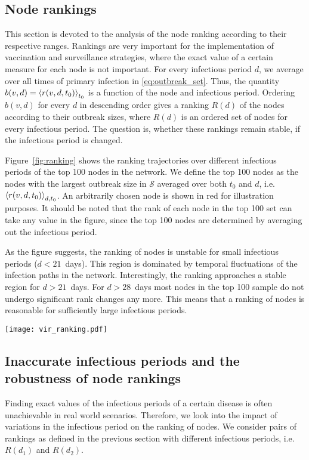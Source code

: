 \subsection{Node rankings}
This section is devoted to the analysis of the node ranking according to their respective ranges.
Rankings are very important for the implementation of vaccination and surveillance strategies, where the exact value of a certain measure for each node is not important.
For every infectious period $d$, we average over all times of primary infection in \eqref{eq:outbreak_set}.
Thus, the quantity $b(v,d)=\left< r(v,d,t_0) \right>_{t_0}$ is a function of the node and infectious period.
Ordering $b(v,d)$ for every $d$ in descending order gives a ranking $R(d)$ of the nodes according to their outbreak sizes, where $R(d)$ is an ordered set of nodes for every infectious period.
The question is, whether these rankings remain stable, if the infectious period is changed.

Figure~\ref{fig:ranking} shows the ranking trajectories over different infectious periods of the top 100 nodes in the network. 
We define the top 100 nodes as the nodes with the largest outbreak size in $\mathcal{S}$ averaged over both $t_0$ and $d$, i.e. $\left< r(v,d,t_0) \right>_{d,t_0}$.
An arbitrarily chosen node is shown in red for illustration purposes.
It should be noted that the rank of each node in the top 100 set can take any value in the figure, since the top 100 nodes are determined by averaging out the infectious period.

As the figure suggests, the ranking of nodes is unstable for small infectious periods ($d<21$~days).
This region is dominated by temporal fluctuations of the infection paths in the network.
Interestingly, the ranking approaches a stable region for $d>21$~days.
For $d>28$~days most nodes in the top 100 sample do not undergo significant rank changes any more.
This means that a ranking of nodes is reasonable for sufficiently large infectious periods.
%
\begin{SCfigure}
\texttt{[image: vir\_ranking.pdf]}
\caption{Node ranking of the top 100 nodes over different infectious periods.
Rankings are computed by averaging \eqref{eq:outbreak_set} over the time of primary infection.
Top 100 nodes are the nodes with the largest outbreak sizes averaged over $d$ and $t_0$.
The rankings of an arbitrary node are shown in red for illustration purposes.}
\label{fig:ranking}
\end{SCfigure}

\subsection{Inaccurate infectious periods and the robustness of node rankings}
Finding exact values of the infectious periods of a certain disease is often unachievable in real world scenarios.
Therefore, we look into the impact of variations in the infectious period on the ranking of nodes.
We consider pairs of rankings as defined in the previous section with different infectious periods, i.e. $R(d_1)$ and $R(d_2)$.

